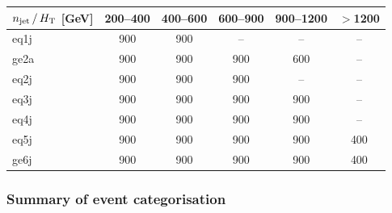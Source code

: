 \begin{table}[!h]
  \label{tab:mht-binning}
  \centering
  \begin{tabular}{ lccccc }
    \hline
    $n_{\text{jet}}\, / \,\mbox{$H_\text{T}$}$ [GeV] & 200--400 & 400--600 & 600--900 & 900--1200 & $>$1200 \\
    \hline
    eq1j                        & 900      & 900      & --       & --        & --      \\ 
    ge2a                        & 900      & 900      & 900      & 600       & --      \\ 
    eq2j                        & 900      & 900      & 900      & --        & --      \\ 
    eq3j                        & 900      & 900      & 900      & 900       & --      \\ 
    eq4j                        & 900      & 900      & 900      & 900       & --      \\ 
    eq5j                        & 900      & 900      & 900      & 900       & 400     \\ 
    ge6j                        & 900      & 900      & 900      & 900       & 400     \\ 
    \hline
  \end{tabular}
\end{table}

\subsubsection{Summary of event categorisation}
\label{sec:binning-summary}

